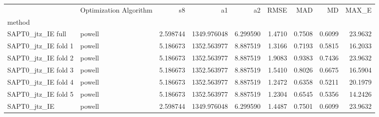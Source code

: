 \begin{tabular}{llrrrrrrr}
 & Optimization Algorithm & s8 & a1 & a2 & RMSE & MAD & MD & MAX_E \\
method &  &  &  &  &  &  &  &  \\
SAPT0_jtz_IE full & powell & 2.598744 & 1349.976048 & 6.299590 & 1.4710 & 0.7508 & 0.6099 & 23.9632 \\
SAPT0_jtz_IE fold 1 & powell & 5.186673 & 1352.563977 & 8.887519 & 1.3166 & 0.7193 & 0.5815 & 16.2033 \\
SAPT0_jtz_IE fold 2 & powell & 5.186673 & 1352.563977 & 8.887519 & 1.9083 & 0.9383 & 0.7436 & 23.9632 \\
SAPT0_jtz_IE fold 3 & powell & 5.186673 & 1352.563977 & 8.887519 & 1.5410 & 0.8026 & 0.6675 & 16.5904 \\
SAPT0_jtz_IE fold 4 & powell & 5.186673 & 1352.563977 & 8.887519 & 1.2472 & 0.6358 & 0.5211 & 20.1979 \\
SAPT0_jtz_IE fold 5 & powell & 5.186673 & 1352.563977 & 8.887519 & 1.2304 & 0.6545 & 0.5356 & 14.2426 \\
SAPT0_jtz_IE & powell & 2.598744 & 1349.976048 & 6.299590 & 1.4487 & 0.7501 & 0.6099 & 23.9632 \\
\end{tabular}
